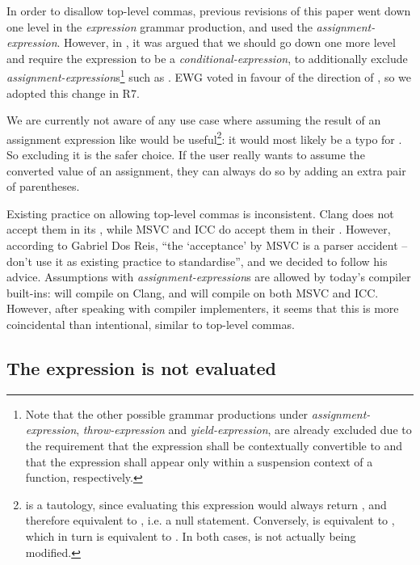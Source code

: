 In order to disallow top-level commas, previous revisions of this paper went down one level in the \emph{expression} grammar production, and used the \emph{assignment-expression}. However, in \cite{P2507R1}, it was argued that we should go down one more level and require the expression to be a \emph{conditional-expression}, to additionally exclude \emph{assignment-expression}s\footnote{Note that the other possible grammar productions under \emph{assignment-expression}, \emph{throw-expression} and \emph{yield-expression}, are already excluded due to the requirement that the expression shall be contextually convertible to  and that the expression shall appear only within a suspension context of a function, respectively.} such as \tcode{[[assume(x = 1)]]}. EWG voted in favour of the direction of \cite{P2507R1}, so we adopted this change in R7.

We are currently not aware of any use case where assuming the result of an assignment expression like \tcode{[[assume(x = 1)]]} would be useful\footnote{ is a tautology, since evaluating this expression would always return , and therefore equivalent to , i.e. a null statement. Conversely,  is equivalent to , which in turn is equivalent to . In both cases,  is not actually being modified.}: it would most likely be a typo for \tcode{[[assume(x == 1)]]}. So excluding it is the safer choice. If the user really wants to assume the converted  value of an assignment, they can always do so by adding an extra pair of parentheses.


Existing practice on allowing top-level commas is inconsistent. Clang does not accept them in its , while MSVC and ICC do accept them in their . However, according to Gabriel Dos Reis, ``the `acceptance' by MSVC is a parser accident -- don't use it as existing practice to standardise'', and we decided to follow his advice. Assumptions with \emph{assignment-expression}s are allowed by today's compiler built-ins:  will compile on Clang, and  will compile on both MSVC and ICC. However, after speaking with compiler implementers, it seems that this is more coincidental than intentional, similar to top-level commas.

\subsection{The expression is not evaluated}

